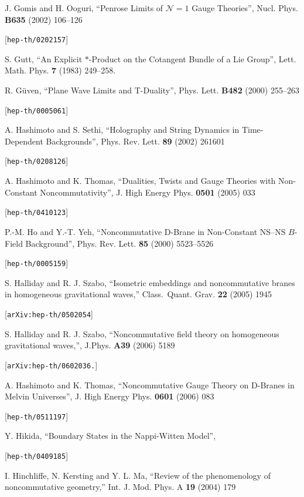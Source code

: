 \begin{thebibliography}{200}
 J. Gomis and H. Ooguri, ``Penrose Limits of $\mathcal{N}=1$ Gauge Theories'', Nucl. Phys. {\bf B635} (2002) 106--126 

 [{\tt hep-th/0202157}] 

 S. Gutt, ``An Explicit $*$-Product on the Cotangent Bundle of a Lie Group'', Lett. Math. Phys. {\bf 7} (1983) 249--258. 

 R. G\"uven, ``Plane Wave Limits and T-Duality'', Phys. Lett. {\bf B482} (2000) 255--263 

 [{\tt hep-th/0005061}] 

 A. Hashimoto and S. Sethi, ``Holography and String Dynamics in Time-Dependent Backgrounds'', Phys. Rev. Lett. {\bf 89} (2002) 261601 

 [{\tt hep-th/0208126}] 

 A. Hashimoto and K. Thomas, ``Dualities, Twists and Gauge Theories with Non-Constant Noncommutativity'', J. High Energy Phys. {\bf 0501} (2005) 033 

 [{\tt hep-th/0410123}] 

 P.-M. Ho and Y.-T. Yeh, ``Noncommutative D-Brane in Non-Constant NS--NS $B$-Field Background'', Phys. Rev. Lett. {\bf 85} (2000) 5523--5526 

 [{\tt hep-th/0005159}] 

 S. Halliday and R. J. Szabo, ``Isometric embeddings
  and noncommutative branes in homogeneous gravitational waves,'' Class.\ Quant.
  Grav. {\bf 22} (2005) 1945 

 [{\tt arXiv:hep-th/0502054}]

 S. Halliday and R. J. Szabo, ``Noncommutative field
  theory on homogeneous gravitational waves,'', J.Phys. {\bf A39} (2006) 5189
  

 [{\tt arXiv:hep-th/0602036.}]

 A. Hashimoto and K. Thomas, ``Noncommutative Gauge Theory on D-Branes in Melvin Universes'', J. High Energy Phys. {\bf 0601} (2006) 083 

 [{\tt hep-th/0511197}] 

 Y. Hikida, ``Boundary States in the Nappi-Witten Model'', 

 [{\tt hep-th/0409185}] 

 I. Hinchliffe, N. Kersting and Y. L. Ma, ``Review of the phenomenology of noncommutative geometry,'' Int. J. Mod. Phys. A {\bf 19} (2004) 179 


\end{thebibliography}
